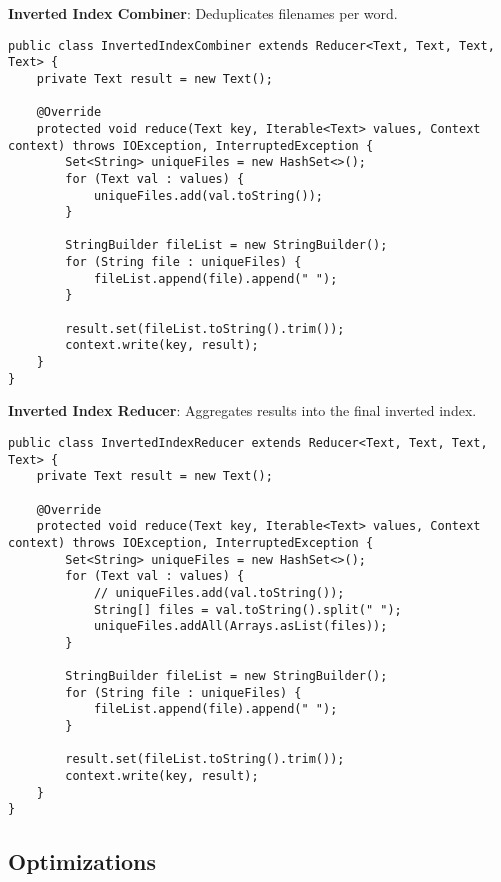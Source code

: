 \textbf{Inverted Index Combiner}: Deduplicates filenames per word.

\begin{lstlisting}[style=javastyle,label={lst:inverted-index-combiner},caption={Inverted Index Combiner}]
public class InvertedIndexCombiner extends Reducer<Text, Text, Text, Text> {
    private Text result = new Text();

    @Override
    protected void reduce(Text key, Iterable<Text> values, Context context) throws IOException, InterruptedException {
        Set<String> uniqueFiles = new HashSet<>();
        for (Text val : values) {
            uniqueFiles.add(val.toString());
        }

        StringBuilder fileList = new StringBuilder();
        for (String file : uniqueFiles) {
            fileList.append(file).append(" ");
        }

        result.set(fileList.toString().trim());
        context.write(key, result);
    }
}
\end{lstlisting}

\textbf{Inverted Index Reducer}: Aggregates results into the final inverted index.


\begin{lstlisting}[style=javastyle,label={lst:inverted-index-reducer},caption={Inverted Index Reducer}]
public class InvertedIndexReducer extends Reducer<Text, Text, Text, Text> {
    private Text result = new Text();

    @Override
    protected void reduce(Text key, Iterable<Text> values, Context context) throws IOException, InterruptedException {
        Set<String> uniqueFiles = new HashSet<>();
        for (Text val : values) {
            // uniqueFiles.add(val.toString());
            String[] files = val.toString().split(" ");
            uniqueFiles.addAll(Arrays.asList(files));
        }

        StringBuilder fileList = new StringBuilder();
        for (String file : uniqueFiles) {
            fileList.append(file).append(" ");
        }

        result.set(fileList.toString().trim());
        context.write(key, result);
    }
}
\end{lstlisting}


\subsection{Optimizations}\label{subsec:optimizations}

